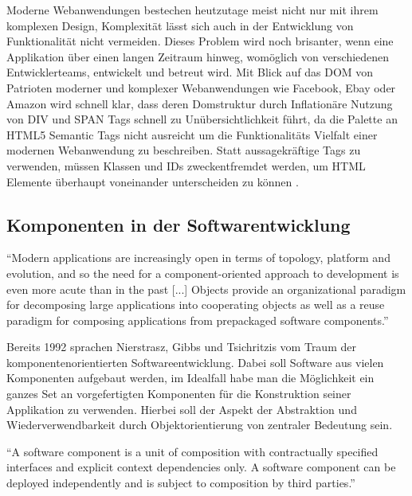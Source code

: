 Moderne Webanwendungen bestechen heutzutage meist nicht nur mit ihrem komplexen Design, Komplexität lässt sich auch in der Entwicklung
von Funktionalität nicht vermeiden. Dieses Problem wird noch brisanter, wenn eine Applikation über einen langen Zeitraum hinweg,
womöglich von verschiedenen Entwicklerteams, entwickelt und betreut wird. Mit Blick auf das \ac{DOM} von Patrioten moderner und komplexer Webanwendungen wie Facebook, Ebay oder Amazon
wird schnell klar, dass deren Domstruktur durch Inflationäre Nutzung von DIV und SPAN Tags schnell zu Unübersichtlichkeit führt,
da die Palette an HTML5 Semantic Tags nicht ausreicht um die Funktionalitäts Vielfalt einer modernen Webanwendung zu beschreiben.
Statt aussagekräftige Tags zu verwenden, müssen Klassen und IDs zweckentfremdet werden, um HTML Elemente überhaupt voneinander unterscheiden zu können
\cite{sitepoint-introduction-to-webcomponents}.

\subsection{Komponenten in der Softwarentwicklung}

``Modern applications are increasingly
open in terms of topology,
platform and evolution, and so the
need for a component-oriented
approach to development is even
more acute than in the past [...]  Objects provide an organizational
paradigm for decomposing large
applications into cooperating objects
as well as a reuse paradigm for
composing applications from prepackaged
software components.''
\cite{nierstrasz1992component}

\vspace{0.5cm}

Bereits 1992 sprachen Nierstrasz, Gibbs und Tsichritzis vom Traum der komponentenorientierten Softwareentwicklung.
Dabei soll Software aus vielen Komponenten aufgebaut werden, im Idealfall habe man die Möglichkeit ein
ganzes Set an vorgefertigten Komponenten für die Konstruktion seiner Applikation zu verwenden.
Hierbei soll der Aspekt der Abstraktion und Wiederverwendbarkeit durch Objektorientierung von zentraler Bedeutung sein.

\vspace{0.5cm}
``A software component is a unit of composition with contractually specified interfaces and explicit
context dependencies only. A software component can be deployed independently and is subject to composition
by third parties.''
\cite{Szyperski}
\vspace{0.5cm}


